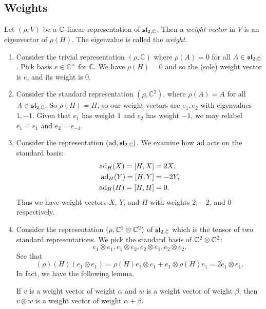 \subsection{Weights}

\begin{definition}
    Let $(\rho, V)$ be a $\mathbb C$-linear representation of $\mathfrak{sl}_{2, \mathbb C}$. Then a \emph{weight vector} in $V$ is an eigenvector of $\rho(H)$. The eigenvalue is called the \emph{weight}.
\end{definition}

\begin{example}
    \begin{enumerate}
        \item Consider the trivial representation $(\rho, \mathbb C)$ where $\rho(A) = 0$ for all $A \in \mathfrak{sl}_{2, \mathbb C}$. Pick basis $e \in \mathbb C^\times$ for $\mathbb C$. We have $\rho(H) = 0$ and so the (sole) weight vector is $e$, and its weight is $0$.
        \item Consider the standard representation $(\rho, \mathbb C^2)$, where $\rho(A) = A$ for all $A \in \mathfrak{sl}_{2, \mathbb C}$. So $\rho(H) = H$, so our weight vectors are $e_1, e_2$ with eigenvalues $1, -1$. Given that $e_1$ has weight $1$ and $e_2$ has weight $-1$, we may relabel $e_1 = e_1$ and $e_2 = e_{-1}$.
        \item Consider the representation $(\operatorname{ad}, \mathfrak{sl}_{2, \mathbb C})$. We examine how $\operatorname{ad}$ acts on the standard basis:
              \begin{align*}
                  \operatorname{ad}_H(X) = [H,X] & = 2X,  \\
                  \operatorname{ad}_H(Y) = [H,Y] & = -2Y, \\
                  \operatorname{ad}_H(H) = [H,H] & = 0.
              \end{align*}
              Thus we have weight vectors $X$, $Y$, and $H$ with weights $2$, $-2$, and $0$ respectively.
        \item Consider the representation $(\rho, \mathbb C^2 \otimes \mathbb C^2)$ of $\mathfrak{sl}_{2, \mathbb C}$ which is the tensor of two standard representations. We pick the standard basis of $\mathbb C^2 \otimes \mathbb C^2$:
              \[ e_1 \otimes e_1, e_1 \otimes e_2, e_2 \otimes e_1, e_2 \otimes e_2. \]
              See that
              \[ (\rho)(H)(e_1 \otimes e_1) = \rho(H)e_1 \otimes e_1 + e_1 \otimes \rho(H) e_1 = 2e_1 \otimes e_1. \]
              In fact, we have the following lemma.
              \begin{lemma}
                  If $v$ is a weight vector of weight $\alpha$ and $w$ is a weight vector of weight $\beta$, then $v \otimes w$ is a weight vector of weight $\alpha + \beta$.

\end{lemma}
\end{enumerate}
\end{example}
